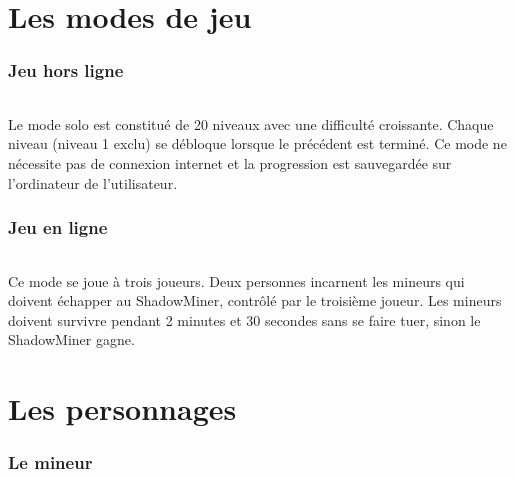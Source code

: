 \documentclass[titlepage, 13px, a4paper]{report}
\begin{document}

\newpage


\part{Les modes de jeu} 

\section{Jeu hors ligne}
\paragraph*{} \hspace{0pt}
Le mode solo est constitué de 20 niveaux avec une difficulté croissante. 
Chaque niveau (niveau 1 exclu) se débloque lorsque le précédent est terminé. 
Ce mode ne nécessite pas de connexion internet et la progression est sauvegardée sur l'ordinateur de l'utilisateur. \\

\section{Jeu en ligne} 
\paragraph*{} \hspace{0pt}
Ce mode se joue à trois joueurs. Deux personnes incarnent les mineurs qui doivent échapper au ShadowMiner, 
contrôlé par le troisième joueur. Les mineurs doivent survivre pendant 2 minutes et 30 secondes 
sans se faire tuer, sinon le ShadowMiner gagne. \\


\newpage


\part{Les personnages} 

\section{Le mineur}
\end{document}
